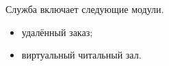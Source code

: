 Служба включает следующие модули.
\begin{itemize} %
  \item удалённый заказ;
  \item виртуальный читальный зал.
\end{itemize}
